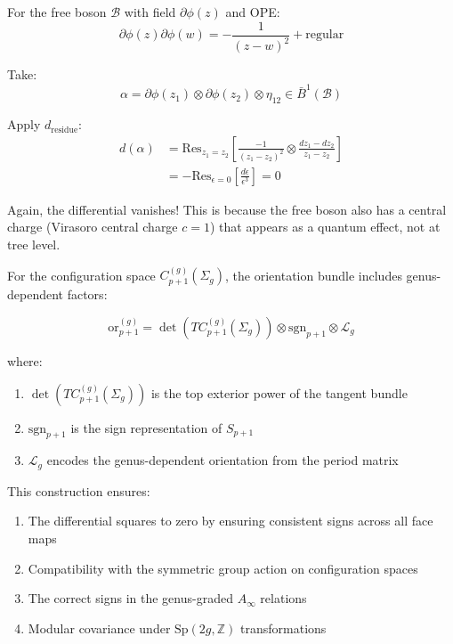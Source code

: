 \begin{example}\label{ex:free-boson-d-deg1}
For the free boson $\mathcal{B}$ with field $\partial\phi(z)$ and OPE:
$$\partial\phi(z) \partial\phi(w) = -\frac{1}{(z-w)^2} + \text{regular}$$

Take:
$$\alpha = \partial\phi(z_1) \otimes \partial\phi(z_2) \otimes \eta_{12} \in \bar{B}^1(\mathcal{B})$$

Apply $d_{\text{residue}}$:
\begin{align*}
d(\alpha) &= \text{Res}_{z_1=z_2}\left[\frac{-1}{(z_1-z_2)^2} \otimes \frac{dz_1-dz_2}{z_1-z_2}\right] \\
&= -\text{Res}_{\epsilon=0}\left[\frac{d\epsilon}{\epsilon^3}\right] = 0
\end{align*}

Again, the differential vanishes! This is because the free boson also has a central charge (Virasoro central charge $c=1$) that appears as a quantum effect, not at tree level.
\end{example}

\begin{definition}
For the configuration space $C_{p+1}^{(g)}(\Sigma_g)$, the orientation bundle includes genus-dependent factors:

$$\text{or}_{p+1}^{(g)} = \det(TC_{p+1}^{(g)}(\Sigma_g)) \otimes \text{sgn}_{p+1} \otimes \mathcal{L}_g$$

where:
\begin{enumerate}
\item $\det(TC_{p+1}^{(g)}(\Sigma_g))$ is the top exterior power of the tangent bundle
\item $\text{sgn}_{p+1}$ is the sign representation of $S_{p+1}$
\item $\mathcal{L}_g$ encodes the genus-dependent orientation from the period matrix
\end{enumerate}

This construction ensures:
\begin{enumerate}
\item The differential squares to zero by ensuring consistent signs across all face maps
\item Compatibility with the symmetric group action on configuration spaces
\item The correct signs in the genus-graded $A_\infty$ relations
\item Modular covariance under $\text{Sp}(2g, \mathbb{Z})$ transformations
\end{enumerate}
\end{definition}

